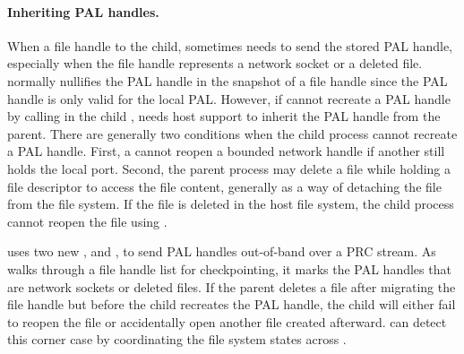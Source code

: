 \paragraph{Inheriting PAL handles.}
When a file handle to the child, \thelibos{} sometimes needs to send the stored PAL handle, especially when the file handle
represents a network socket or a deleted file.
\thelibos{} normally nullifies the PAL handle in the snapshot of a file handle
since the PAL handle is only valid for the local PAL.
However, if \thelibos{} cannot recreate a PAL handle by calling  in the child \picoproc{}, \thelibos{} needs host support to inherit
the PAL handle from the parent.
There are generally two conditions when the child process
cannot recreate a PAL handle.
First, a \picoproc{} cannot reopen a bounded network handle
if another \picoproc{} still holds the local port.
Second, the parent process may delete a file while holding a file descriptor to access the file content, generally as a way of detaching the file from the file system.
If the file is deleted in the host file system,
the child process cannot reopen the file
using .



\thelibos{} uses two new \hostapis{},
 and , to send PAL handles out-of-band over a PRC stream.
As \thelibos{} walks through a file handle list for checkpointing, it marks the PAL handles that are network sockets or deleted files.
If the parent deletes a file after migrating the file handle but before the child recreates the PAL handle,
the child will either fail to reopen the file
or accidentally open another file created afterward.
\thelibos{} can detect this corner case by coordinating the file system states
across \picoprocs{}.




